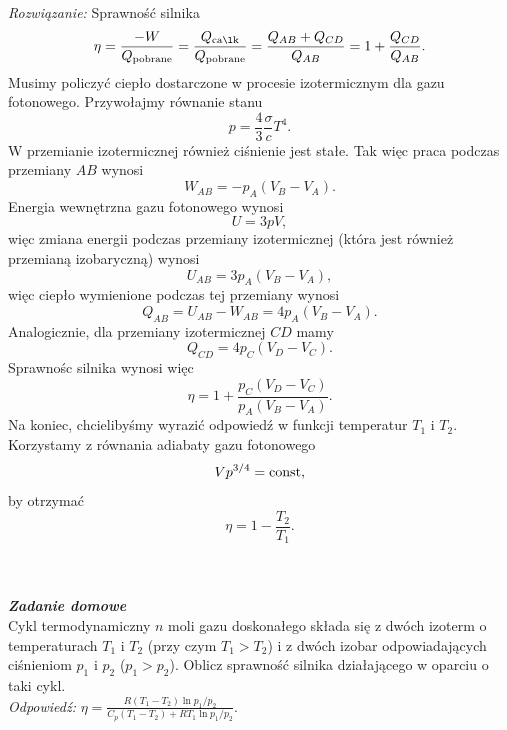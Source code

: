 \documentclass[11pt,a4paper]{article}
\newcounter{zaddom}\newcommand{\zaddom}[1][]{\addtocounter{zaddom}{1} ~\\  {\bf \emph{Zadanie domowe \arabic{zaddom} #1 }} \\}
\begin{document}
{\em Rozwiązanie:}
Sprawność silnika
\begin{equation}
	\eta = \frac{- W}{Q_{\rm pobrane}} = \frac{Q_{\rm całk}}{Q_{\rm pobrane}} = \frac{Q_{AB} + Q_{CD}}{Q_{AB}} = 1 + \frac{Q_{CD}}{Q_{AB}}.
\end{equation}
Musimy policzyć ciepło dostarczone w procesie izotermicznym dla gazu fotonowego. Przywołajmy równanie stanu
\begin{equation}
	p = \frac{4}{3} \frac{\sigma}{c} T^4.
\end{equation}
W przemianie izotermicznej również ciśnienie jest stałe. Tak więc praca podczas przemiany $AB$ wynosi
\begin{equation}
	W_{AB} = - p_A (V_B - V_A).
\end{equation}
Energia wewnętrzna gazu fotonowego wynosi
\begin{equation}
	U = 3 p V, 
\end{equation}
więc zmiana energii podczas przemiany izotermicznej (która jest również przemianą izobaryczną) wynosi
\begin{equation}
	U_{AB} = 3 p_A (V_B - V_A),
\end{equation}
więc ciepło wymienione podczas tej przemiany wynosi
\begin{equation}
	Q_{AB} = U_{AB} - W_{AB} = 4 p_A (V_B - V_A).
\end{equation}
Analogicznie, dla przemiany izotermicznej $CD$ mamy
\begin{equation}
	Q_{CD} = 4 p_C (V_D - V_C).
\end{equation}
Sprawnośc silnika wynosi więc
\begin{equation}
	\eta = 1 + \frac{p_C (V_D - V_C)}{p_A (V_B - V_A)}.
\end{equation}
Na koniec, chcielibyśmy wyrazić odpowiedź w funkcji temperatur $T_1$ i $T_2$. Korzystamy z równania adiabaty gazu fotonowego
\begin{equation}
	V p^{3/4} = {\rm const},
\end{equation} 
by otrzymać
\begin{equation}
	\eta = 1 - \frac{T_2}{T_1}.
\end{equation}
\fi
\pagebreak
~
\zaddom
Cykl termodynamiczny $n$ moli gazu doskonałego składa się z dwóch izoterm o temperaturach $T_1$ i $T_2$ (przy czym $T_1 > T_2$) i z dwóch izobar odpowiadających ciśnieniom $p_1$ i $p_2$ ($p_1 > p_2$).
 Oblicz sprawność silnika działającego w oparciu o taki cykl.\\[1mm]

 {\it Odpowiedź:} $\eta = \frac{R(T_1 - T_2) \ln p_1/p_2}{C_p(T_1 - T_2) + R T_1 \ln p_1/p_2}$.
\end{document}
